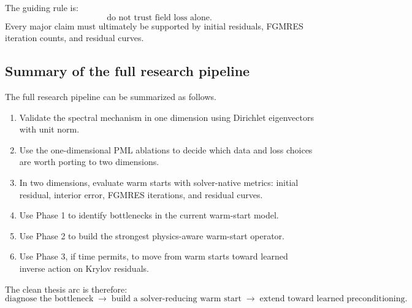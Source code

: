 The guiding rule is:
\[
    \text{do not trust field loss alone.}
\]
Every major claim must ultimately be supported by initial residuals, FGMRES
iteration counts, and residual curves.


\subsection{Summary of the full research pipeline}
\label{subsec:methodology_2d_pipeline_summary}

The full research pipeline can be summarized as follows.
\begin{enumerate}
    \item Validate the spectral mechanism in one dimension using Dirichlet
    eigenvectors with unit norm.
    \item Use the one-dimensional PML ablations to decide which data and loss
    choices are worth porting to two dimensions.
    \item In two dimensions, evaluate warm starts with solver-native metrics:
    initial residual, interior error, FGMRES iterations, and residual curves.
    \item Use Phase 1 to identify bottlenecks in the current warm-start model.
    \item Use Phase 2 to build the strongest physics-aware warm-start operator.
    \item Use Phase 3, if time permits, to move from warm starts toward learned
    inverse action on Krylov residuals.
\end{enumerate}
The clean thesis arc is therefore:
\[
    \text{diagnose the bottleneck}
    \;\longrightarrow\;
    \text{build a solver-reducing warm start}
    \;\longrightarrow\;
    \text{extend toward learned preconditioning}.
\]

